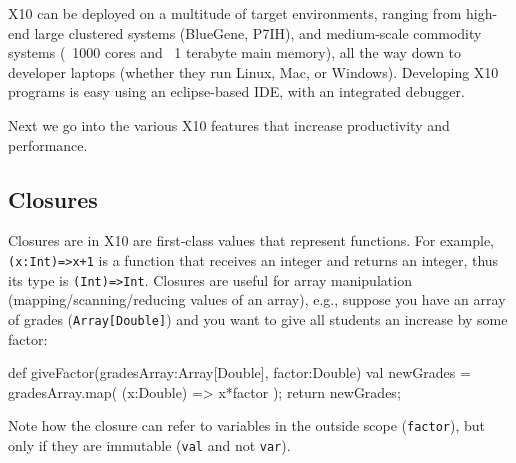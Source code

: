 \documentclass[a4paper]{article}
\def\codesmaller{\small}
\newcommand{\code}[1]{\texttt{\textup{\codesmaller #1}}}
\begin{document}
X10 can be deployed on a multitude of target environments,
    ranging from high-end large clustered systems (BlueGene, P7IH),
    and medium-scale commodity systems (~1000 cores and ~1 terabyte main memory),
    all the way down to developer laptops (whether they run Linux, Mac, or Windows).
Developing X10 programs is easy using an eclipse-based IDE, with an integrated debugger.

Next we go into the various X10 features that increase productivity and performance.

\subsection{Closures}
Closures are in X10 are first-class values that represent functions.
For example, \code{(x:Int)=>x+1} is a function that receives an integer and returns an integer,
    thus its type is \code{(Int)=>Int}.
Closures are useful for array manipulation (mapping/scanning/reducing values of an array),
    e.g., suppose you have an array of grades (\code{Array[Double]}) and you want to give all students
        an increase by some factor:
\begin{xten}
def giveFactor(gradesArray:Array[Double], factor:Double) {
  val newGrades = gradesArray.map( (x:Double) => x*factor );
  return newGrades;
}
\end{xten}
Note how the closure can refer to variables in the outside scope (\code{factor}),
    but only if they are immutable (\code{val} and not \code{var}).
\end{document}
